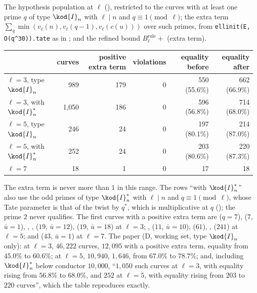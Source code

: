 \begin{sloppypar}
\begin{example}\label{ex:computation:repro-tam}
The hypothesis population at $\ell$ (), restricted to the curves with at least one prime $q$ of type $\kod{I}_n$ with $\ell\mid n$ and
$q\equiv1\pmod\ell$; the extra term $\sum_q\min(v_\ell(n),v_\ell(q-1),v_\ell(c(u)))$ over such primes, from \texttt{ellinit(E, O(q\^{}30)).tate} as in
; and the refined bound $B^{\mathrm{rule}}_\ell+$ (extra term).
\begin{center}\footnotesize
\begin{tabular}{lrrrrr}
\toprule
& curves & positive extra term & violations & equality before & equality after\\
\midrule
$\ell=3$, type $\kod{I}_n$ & 989 & 179 & 0 & 550 (55.6\%) & 662 (66.9\%)\\
$\ell=3$, with $\kod{I}_n^*$ & 1,050 & 186 & 0 & 596 (56.8\%) & 714 (68.0\%)\\
$\ell=5$, type $\kod{I}_n$ & 246 & 24 & 0 & 197 (80.1\%) & 214 (87.0\%)\\
$\ell=5$, with $\kod{I}_n^*$ & 252 & 24 & 0 & 203 (80.6\%) & 220 (87.3\%)\\
$\ell=7$ & 18 & 1 & 0 & 17 & 18\\
\bottomrule
\end{tabular}
\end{center}
The extra term is never more than $1$ in this range. The rows ``with $\kod{I}_n^*$'' also use the odd primes of type $\kod{I}_n^*$ with $\ell\mid n$ and $q\equiv1\pmod\ell$,
whose Tate parameter is that of the twist by $q^*$, which is multiplicative at $q$ (); the prime $2$ never qualifies. The first
curves with a positive extra term are  ($q=7$),  ($7$, $\bar u=1$), , ,  ($19$, $\bar u=12$), 
($19$, $\bar u=18$) at $\ell=3$; ,  ($11$, $\bar u=10$),  ($61$), ,  ($241$) at $\ell=5$; and 
($43$, $\bar u=1$) at $\ell=7$. The paper (D, working set, type $\kod{I}_n$ only): at $\ell=3$, $46{,}222$ curves, $12{,}095$ with a positive extra term, equality from
$45.0\%$ to $60.6\%$; at $\ell=5$, $10{,}940$, $1{,}646$, from $67.0\%$ to $78.7\%$; and, including $\kod{I}_n^*$ below conductor $10{,}000$, ``$1{,}050$ such curves at $\ell=3$, with
equality rising from $56.8\%$ to $68.0\%$, and $252$ at $\ell=5$, with equality rising from $203$ to $220$ curves'', which the table reproduces exactly.
\end{example}


\end{sloppypar}
